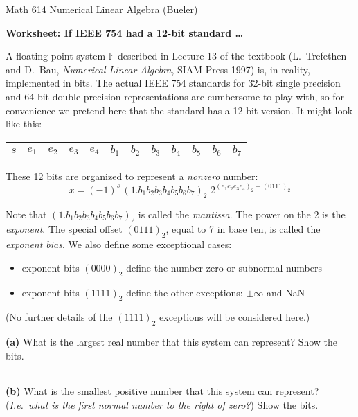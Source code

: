 \documentclass[12pt]{amsart}
\newcommand{\epart}[1]{\bigskip\noindent\textbf{(#1)}\quad }
\newcommand{\bitboxes}{
\large
\begin{center}
\begin{tabular}{|c|c|c|c|c|c|c|c|c|c|c|c|} \hline
\phantom{$e_1$} &
\phantom{$e_1$} &
\phantom{$e_1$} &
\phantom{$e_1$} &
\phantom{$e_1$} &
\phantom{$e_1$} &
\phantom{$e_1$} &
\phantom{$e_1$} &
\phantom{$e_1$} &
\phantom{$e_1$} &
\phantom{$e_1$} &
\phantom{$e_1$} \\ \hline
\end{tabular}
\end{center}
\normalsize}
\begin{document}
\scriptsize \noindent Math 614 Numerical Linear Algebra (Bueler) \hfill {}
\normalsize\medskip

\Large\centerline{\textbf{Worksheet: If IEEE 754 had a 12-bit standard \dots}}
\medskip
\normalsize

\thispagestyle{empty}

A floating point system $\mathbb{F}$ described in Lecture 13 of the textbook (L.~Trefethen and D.~Bau, \emph{Numerical Linear Algebra}, SIAM Press 1997) is, in reality, implemented in bits.  The actual IEEE 754 standards for 32-bit single precision and 64-bit double precision representations are cumbersome to play with, so for convenience we pretend here that the standard has a 12-bit version.  It might look like this:

\medskip\large
\begin{center}
\begin{tabular}{|c|c|c|c|c|c|c|c|c|c|c|c|} \hline
$s$ & $e_1$ & $e_2$ & $e_3$ & $e_4$ & $b_1$ & $b_2$ & $b_3$ & $b_4$ & $b_5$ & $b_6$ & $b_7$ \\ \hline
\end{tabular}
\end{center}
\medskip\normalsize

\noindent These 12 bits are organized to represent a \emph{nonzero} number:
\medskip\large
	$$x = (-1)^s\,(1.b_1 b_2 b_3 b_4 b_5 b_6 b_7)_2 \,\, 2^{(e_1 e_2 e_3 e_4)_2 - (0111)_2}$$
\normalsize

\noindent Note that $(1.b_1 b_2 b_3 b_4 b_5 b_6 b_7)_2$ is called the \emph{mantissa}.  The power on the $2$ is the \emph{exponent}.  The special offset $(0111)_2$, equal to 7 in base ten, is called the \emph{exponent bias}.  We also define some exceptional cases:
\begin{itemize}
\item exponent bits $(0000)_2$ define the number zero or subnormal numbers
\item exponent bits $(1111)_2$ define the other exceptions: $\pm\infty$ and NaN
\end{itemize}
(No further details of the $(1111)_2$ exceptions will be considered here.)

\epart{a}  What is the largest real number that this system can represent?  Show the bits.

\bitboxes
\vfill

\epart{b}  What is the smallest positive number that this system can represent?  (\emph{I.e.~what is the first normal number to the right of zero?})  Show the bits.
\end{document}

